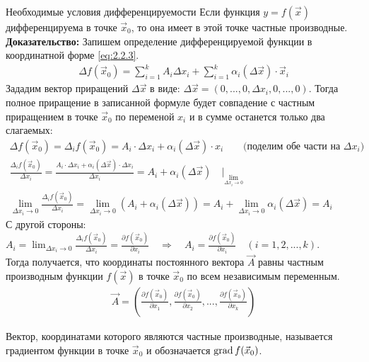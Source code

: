 \begin{tbox}{Необходимые условия дифференцируемости}
	Если функция \( y = f(\vec{x}) \) дифференцируема в точке \( \vec{x}_0 \), то она имеет в этой точке частные производные.\\

	\textbf{Доказательство:} Запишем определение дифференцируемой функции в координатной форме \ref{eq:2.2.3}.
	\begin{align*}
		\Delta f(\vec{x}_0) = \sum_{i=1}^k A_i \Delta x_i + \sum_{i=1}^{k} \alpha_i (\Delta \vec{x}) \cdot \vec{x}_i
	\end{align*}
	Зададим вектор приращений $\Delta \vec{x}$ в виде: $\Delta \vec{x} = (0, ..., 0, \Delta x_i, 0, ..., 0)$.
	Тогда полное приращение в записанной формуле будет совпадение с частным приращением в точке $\vec{x}_0$ по переменой $x_i$ и в сумме останется только два слагаемых:
	\begin{gather*}
		\Delta f(\vec{x}_0) = \Delta_i f(\vec{x}_0) = A_i \cdot \Delta x_i + \alpha_i(\Delta \vec{x}) \cdot x_i \qquad \text{(поделим обе части на $\Delta x_i$)}\\
		\frac{\Delta_i f(\vec{x}_0)}{\Delta x_i} = \frac{A_i \cdot \Delta x_i + \alpha_i (\Delta \vec{x}) \cdot \Delta x_i}{\Delta x_i} = A_i + \alpha_i(\Delta \vec{x}) \quad |_{\lim_{\Delta x_i \to 0}}\\
		\lim_{\Delta x_i \to 0} \frac{\Delta_i f(\vec{x}_0)}{\Delta x_i} = \lim_{\Delta x_i \to 0} \left(A_i + \alpha_i(\Delta \vec{x})\right) = A_i + \lim_{\Delta x_i \to 0} \alpha_i(\Delta \vec{x}) = A_i
	\end{gather*}
	С другой стороны: $\displaystyle A_i = \lim_{\Delta x_i \to 0} \frac{\Delta_i f(\vec{x}_0)}{\Delta x_i} = \frac{\partial f(\vec{x}_0)}{\partial x_i} \quad \Rightarrow \quad \boxed{A_i = \frac{\partial f(\vec{x}_0)}{\partial x_i}} \quad (i = 1,2,...,k)$.\\

	Тогда получается, что координаты постоянного вектора $\vec{A}$ равны частным производным функции $f(\vec{x})$ в точке $\vec{x}_0$ по всем независимым переменным.
	\begin{align}
		\vec{A} = (\frac{\partial f(\vec{x}_0)}{\partial x_1}, \frac{\partial f(\vec{x}_0)}{\partial x_2}, ..., \frac{\partial f(\vec{x}_0)}{\partial x_k})
	\end{align}

	Вектор, координатами которого являются частные производные, называется градиентом функции в точке $\vec{x}_0$ и обозначается $\operatorname{grad} f(\vec{x}_0)$.


\end{tbox}
